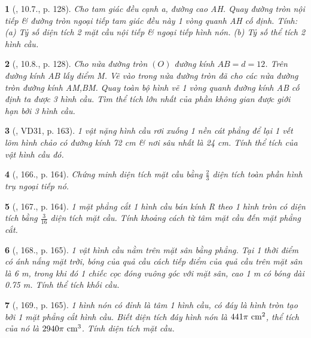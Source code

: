 \documentclass{article}
\newtheorem{baitoan}{}
\begin{document}
\begin{baitoan}[\cite{Binh_boi_duong_Toan_9_tap_2}, 10.7., p. 128]
	Cho tam giác đều cạnh a, đường cao AH. Quay đường tròn nội tiếp \& đường tròn ngoại tiếp tam giác đều này 1 vòng quanh AH cố định. Tính: (a) Tỷ số diện tích 2 mặt cầu nội tiếp \& ngoại tiếp hình nón. (b) Tỷ số thể tích 2 hình cầu.
\end{baitoan}

\begin{baitoan}[\cite{Binh_boi_duong_Toan_9_tap_2}, 10.8., p. 128]
	Cho nửa đường tròn $(O)$ đường kính $AB = d = 12$. Trên đường kính AB lấy điểm M. Vẽ vào trong nửa đường tròn đã cho các nửa đường tròn đường kính AM,BM. Quay toàn bộ hình vẽ 1 vòng quanh đường kính AB cố định ta được 3 hình cầu. Tìm thể tích lớn nhất của phần không gian được giới hạn bởi 3 hình cầu.
\end{baitoan}

\begin{baitoan}[\cite{Tuyen_Toan_9_old}, VD31, p. 163]
	1 vật nặng hình cầu rơi xuống 1 nền cát phẳng để lại 1 vết lõm hình chảo có đường kính {\rm72 cm} \& nơi sâu nhất là {\rm24 cm}. Tính thể tích của vật hình cầu đó.
\end{baitoan}

\begin{baitoan}[\cite{Tuyen_Toan_9_old}, 166., p. 164]
	Chứng minh diện tích mặt cầu bằng $\frac{2}{3}$ diện tích toàn phần hình trụ ngoại tiếp nó.
\end{baitoan}

\begin{baitoan}[\cite{Tuyen_Toan_9_old}, 167., p. 164]
	1 mặt phẳng cắt 1 hình cầu bán kính R theo 1 hình tròn có diện tích bằng $\frac{3}{16}$ diện tích mặt cầu. Tính khoảng cách từ tâm mặt cầu đến mặt phẳng cắt.
\end{baitoan}

\begin{baitoan}[\cite{Tuyen_Toan_9_old}, 168., p. 165]
	1 vật hình cầu nằm trên mặt sân bằng phẳng. Tại 1 thời điểm có ánh nắng mặt trời, bóng của quả cầu cách tiếp điểm của quả cầu trên mặt sân là {\rm6 m}, trong khi đó 1 chiếc cọc đóng vuông góc với mặt sân, cao {\rm1 m} có bóng dài {\rm0.75 m}. Tính thể tích khối cầu.
\end{baitoan}

\begin{baitoan}[\cite{Tuyen_Toan_9_old}, 169., p. 165]
	1 hình nón có đỉnh là tâm 1 hình cầu, có đáy là hình tròn tạo bởi 1 mặt phẳng cắt hình cầu. Biết diện tích đáy hình nón là $441\pi\ {\rm cm}^2$, thể tích của nó là $2940\pi\ {\rm cm}^3$. Tính diện tích mặt cầu.
\end{baitoan}
\end{document}
